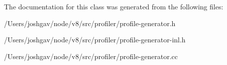 The documentation for this class was generated from the following files\+:\begin{DoxyCompactItemize}
\item 
/\+Users/joshgav/node/v8/src/profiler/profile-\/generator.\+h\item 
/\+Users/joshgav/node/v8/src/profiler/profile-\/generator-\/inl.\+h\item 
/\+Users/joshgav/node/v8/src/profiler/profile-\/generator.\+cc\end{DoxyCompactItemize}
